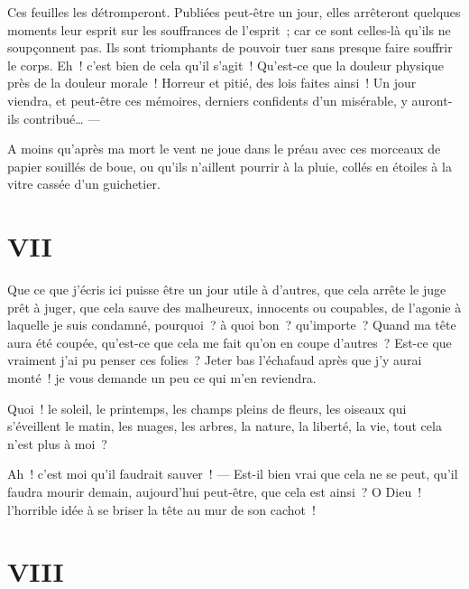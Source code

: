 \documentclass[french,twoside]{book} %
\begin{document}
Ces feuilles les détromperont. Publiées peut-être un jour, elles arrêteront quelques moments leur esprit sur les souffrances de l’esprit ; car ce sont celles-là qu’ils ne soupçonnent pas. Ils sont triomphants de pouvoir tuer sans presque faire souffrir le corps. Eh ! c’est bien de cela qu’il s’agit ! Qu’est-ce que la douleur physique près de la douleur morale ! Horreur et pitié, des lois faites ainsi ! Un jour viendra, et peut-être ces mémoires, derniers confidents d’un misérable, y auront-ils contribué… — \par
A moins qu’après ma mort le vent ne joue dans le préau avec ces morceaux de papier souillés de boue, ou qu’ils n’aillent pourrir à la pluie, collés en étoiles à la vitre cassée d’un guichetier.
 \section[{VII}]{VII}
\label{ch7}\renewcommand{\leftmark}{VII}

\noindent Que ce que j’écris ici puisse être un jour utile à d’autres, que cela arrête le juge prêt à juger, que cela sauve des malheureux, innocents ou coupables, de l’agonie à laquelle je suis condamné, pourquoi ? à quoi bon ? qu’importe ? Quand ma tête aura été coupée, qu’est-ce que cela me fait qu’on en coupe d’autres ? Est-ce que vraiment j’ai pu penser ces folies ? Jeter bas l’échafaud après que j’y aurai monté ! je vous demande un peu ce qui m’en reviendra.\par
Quoi ! le soleil, le printemps, les champs pleins de fleurs, les oiseaux qui s’éveillent le matin, les nuages, les arbres, la nature, la liberté, la vie, tout cela n’est plus à moi ?\par
Ah ! c’est moi qu’il faudrait sauver ! — Est-il bien vrai que cela ne se peut, qu’il faudra mourir demain, aujourd’hui peut-être, que cela est ainsi ? O Dieu ! l’horrible idée à se briser la tête au mur de son cachot !
 \section[{VIII}]{VIII}
\label{ch8}\renewcommand{\leftmark}{VIII}
\end{document}
